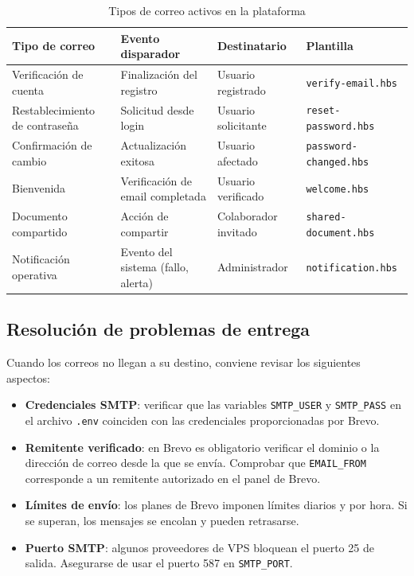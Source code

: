 \documentclass[11pt, a4paper]{article}
\begin{document}
\begin{table}[H]
\centering
\small
\renewcommand{\arraystretch}{1.4}
\begin{tabular}{@{}llll@{}}
\toprule
\textbf{Tipo de correo} & \textbf{Evento disparador} & \textbf{Destinatario} & \textbf{Plantilla} \\
\midrule
Verificaci\'{o}n de cuenta & Finalizaci\'{o}n del registro & Usuario registrado & \texttt{verify-email.hbs} \\
Restablecimiento de contrase\~{n}a & Solicitud desde login & Usuario solicitante & \texttt{reset-password.hbs} \\
Confirmaci\'{o}n de cambio & Actualizaci\'{o}n exitosa & Usuario afectado & \texttt{password-changed.hbs} \\
Bienvenida & Verificaci\'{o}n de email completada & Usuario verificado & \texttt{welcome.hbs} \\
Documento compartido & Acci\'{o}n de compartir & Colaborador invitado & \texttt{shared-document.hbs} \\
Notificaci\'{o}n operativa & Evento del sistema (fallo, alerta) & Administrador & \texttt{notification.hbs} \\
\bottomrule
\end{tabular}
\caption{Tipos de correo activos en la plataforma}
\label{tab:tipos-correo}
\end{table}

\subsection{Resoluci\'{o}n de problemas de entrega}

Cuando los correos no llegan a su destino, conviene revisar los siguientes aspectos:

\begin{itemize}[leftmargin=*]
    \item \textbf{Credenciales SMTP}: verificar que las variables \texttt{SMTP\_USER} y \texttt{SMTP\_PASS} en el archivo \texttt{.env} coinciden con las credenciales proporcionadas por Brevo.
    \item \textbf{Remitente verificado}: en Brevo es obligatorio verificar el dominio o la direcci\'{o}n de correo desde la que se env\'{i}a. Comprobar que \texttt{EMAIL\_FROM} corresponde a un remitente autorizado en el panel de Brevo.
    \item \textbf{L\'{i}mites de env\'{i}o}: los planes de Brevo imponen l\'{i}mites diarios y por hora. Si se superan, los mensajes se encolan y pueden retrasarse.
    \item \textbf{Puerto SMTP}: algunos proveedores de VPS bloquean el puerto 25 de salida. Asegurarse de usar el puerto 587 en \texttt{SMTP\_PORT}.
\end{itemize}
\end{document}
